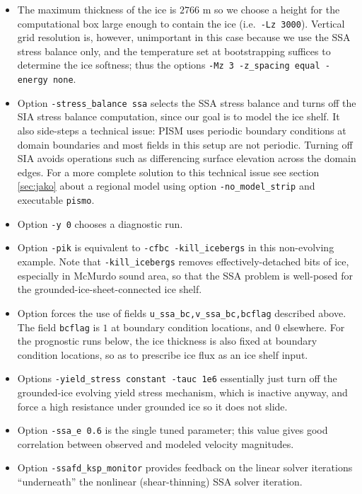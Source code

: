 \begin{itemize}
\item The maximum thickness of the ice is $2766$ m so we choose a height for the computational box large enough to contain the ice (i.e.~\texttt{-Lz 3000}).  Vertical grid resolution is, however, unimportant in this case because we use the SSA stress balance only, and the temperature set at bootstrapping suffices to determine the ice softness; thus the options \texttt{-Mz 3 -z_spacing equal -energy none}.

\item Option \texttt{-stress_balance ssa} selects the SSA stress balance and turns off the SIA stress balance computation, since our goal is to model the ice shelf.  It also side-steps a technical issue: PISM uses periodic boundary conditions at domain boundaries and most fields in this setup are not periodic.  Turning off SIA avoids operations such as differencing surface elevation across the domain edges.  For a more complete solution to this technical issue see section \ref{sec:jako} about a regional model using option \verb|-no_model_strip| and executable \verb|pismo|.

\item Option \texttt{-y 0} chooses a diagnostic run.

\item Option \texttt{-pik} is equivalent to \texttt{-cfbc -kill_icebergs} in this non-evolving example.  Note that \texttt{-kill_icebergs} removes effectively-detached bits of ice, especially in McMurdo sound area, so that the SSA problem is well-posed for the grounded-ice-sheet-connected ice shelf.

\item Option  forces the use of fields \texttt{u_ssa_bc,v_ssa_bc,bcflag} described above.  The field \texttt{bcflag} is $1$ at boundary condition locations, and $0$ elsewhere.  For the prognostic runs below, the ice thickness is also fixed at boundary condition locations, so as to prescribe ice flux as an ice shelf input.

\item Options \texttt{-yield_stress constant -tauc 1e6} essentially just turn off the grounded-ice evolving yield stress mechanism, which is inactive anyway, and force a high resistance under grounded ice so it does not slide.  

\item Option \texttt{-ssa_e 0.6} is the single tuned parameter; this value gives good correlation between observed and modeled velocity magnitudes.

\item Option \texttt{-ssafd_ksp_monitor} provides feedback on the linear solver iterations ``underneath'' the nonlinear (shear-thinning) SSA solver iteration.
\end{itemize}

